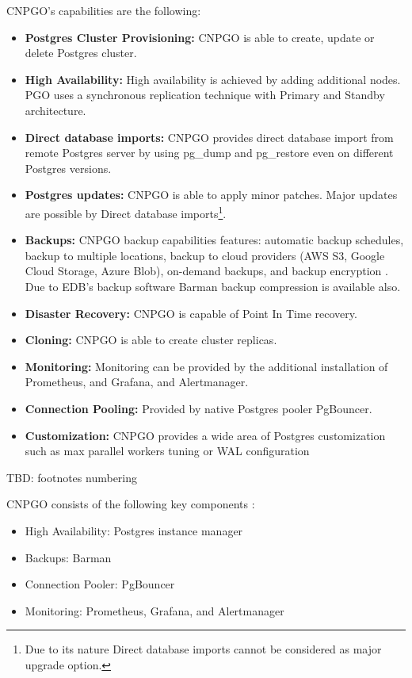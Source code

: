 CNPGO’s capabilities are the following:
\begin{itemize}
  \item \textbf{Postgres Cluster Provisioning:} CNPGO is able to create, update or delete Postgres cluster. \cite{CNPGdocuCapabilityLevels}
  \item \textbf{High Availability:} High availability is achieved by adding additional nodes. PGO uses a synchronous replication technique with Primary and Standby architecture. \cite{CNPGdocuReplication}
  \item \textbf{Direct database imports:} CNPGO provides direct database import from remote Postgres server by using pg\_dump and pg\_restore even on different Postgres versions. \cite{CNPGdocuDatabaseImports}
  \item \textbf{Postgres updates:} CNPGO is able to apply minor patches. \cite{CNPGdocuUpdates} Major updates are possible by Direct database imports\footnote{Due to its nature Direct database imports cannot be considered as major upgrade option.}.
  \item \textbf{Backups:} CNPGO backup capabilities features: automatic backup schedules, backup to multiple locations, backup to cloud providers (AWS S3, Google Cloud Storage, Azure Blob), on-demand backups, and backup encryption \cite{CNPGdocuBackup}\cite{CNPGdocuTDE}. Due to EDB’s backup software Barman backup compression is available also. \cite{CNPGdocuBackup}
  \item \textbf{Disaster Recovery:} CNPGO is capable of Point In Time recovery. \cite{CNPGdocuBackup}
  \item \textbf{Cloning:} CNPGO is able to create cluster replicas. \cite{CNPGdocuReplication}
  \item \textbf{Monitoring:} Monitoring can be provided by the additional installation of Prometheus, and Grafana, and Alertmanager. \cite{CNPGdocuQuickstart}
  \item \textbf{Connection Pooling:} Provided by native Postgres pooler PgBouncer. \cite{CNPGdocuConnectionPooling}
  \item \textbf{Customization:} CNPGO provides a wide area of Postgres customization such as max parallel workers tuning or WAL configuration \cite{CNPGdocuConfiguration}
\end{itemize}

TBD: footnotes numbering

CNPGO consists of the following key components \cite{PostgresOnKubernetes} \cite{CNPGdocuQuickstart}:
\begin{itemize}
  \item High Availability: Postgres instance manager
  \item Backups: Barman
  \item Connection Pooler: PgBouncer
  \item Monitoring: Prometheus, Grafana, and Alertmanager
\end{itemize}

